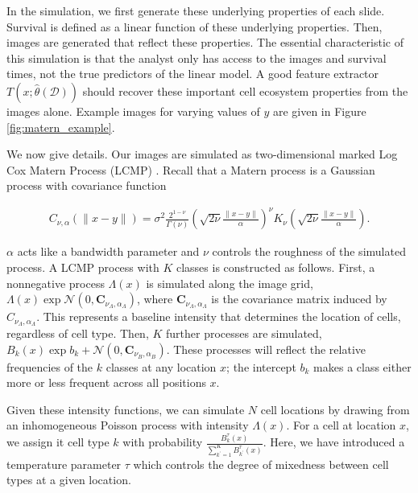 In the simulation, we first generate these underlying properties of each slide.
Survival is defined as a linear function of these underlying properties. Then,
images are generated that reflect these properties. The essential characteristic
of this simulation is that the analyst only has access to the images and
survival times, not the true predictors of the linear model. A good feature
extractor $T\left(x; \hat{\theta}\left(\mathcal{D}\right)\right)$ should recover
these important cell ecosystem properties from the images alone. Example images
for varying values of $y$ are given in Figure \ref{fig:matern_example}.

We now give details. Our images are simulated as two-dimensional marked Log Cox
Matern Process (LCMP) \cite{diggle2013}. Recall that a Matern process is a
Gaussian process with covariance function

\begin{align*}
C_{\nu, \alpha}(\|x - y\|)=\sigma^{2} \frac{2^{1-\nu}}{\Gamma(\nu)}\left(\sqrt{2 \nu} \frac{\|x - y\|}{\alpha}\right)^{\nu} K_{\nu}\left(\sqrt{2 \nu} \frac{\|x - y\|}{\alpha}\right).
\end{align*}

$\alpha$ acts like a bandwidth parameter and $\nu$ controls the roughness of the
simulated process. A LCMP process with $K$ classes is constructed as follows.
First, a nonnegative process $\Lambda\left(x\right)$ is simulated along the
image grid, $\Lambda\left(x\right) \exp{\mathcal{N}\left(0,
  \mathbf{C}_{\nu_{\Lambda}, \alpha_{\Lambda}}\right)}$, where
$\mathbf{C}_{\nu_{\Lambda}, \alpha_{\Lambda}}$ is the covariance matrix induced
by $C_{\nu_{\Lambda}, \alpha_{\Lambda}}$. This represents a baseline intensity
that determines the location of cells, regardless of cell type. Then, $K$
further processes are simulated, $B_{k}\left(x\right) \exp{b_{k} +
  \mathcal{N}\left(0, \mathbf{C}_{\nu_{B}, \alpha_{B}}\right)} $. These
processes will reflect the relative frequencies of the $k$ classes at any
location $x$; the intercept $b_k$ makes a class either more or less frequent
across all positions $x$.

Given these intensity functions, we can simulate $N$ cell locations by drawing
from an inhomogeneous Poisson process with intensity $\Lambda\left(x\right)$.
For a cell at location $x$, we assign it cell type $k$ with probability
$\frac{B_{k}^{\tau}\left(x\right)}{\sum_{k^\prime = 1}^{K}
  B^{\tau}_{k^\prime}\left(x\right)}$. Here, we have introduced a temperature
parameter $\tau$ which controls the degree of mixedness between cell types at a
given location.

